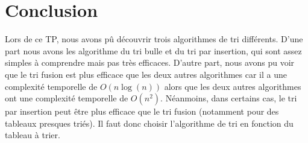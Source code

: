 \documentclass[12pt]{article}
\begin{document}
\section{Conclusion}
Lors de ce TP, nous avons pû découvrir trois algorithmes de tri différents. D'une part nous avons les algorithme du tri bulle et du tri par insertion, qui sont assez simples à comprendre mais pas très efficaces. D'autre part, nous avons pu voir que le tri fusion est plus efficace que les deux autres algorithmes car il a une complexité temporelle de $O(n\log(n))$ alors que les deux autres algorithmes ont une complexité temporelle de $O(n^2)$. Néanmoins, dans certains cas, le tri par insertion peut être plus efficace que le tri fusion (notamment pour des tableaux presques triés). Il faut donc choisir l'algorithme de tri en fonction du tableau à trier.
\end{document}
